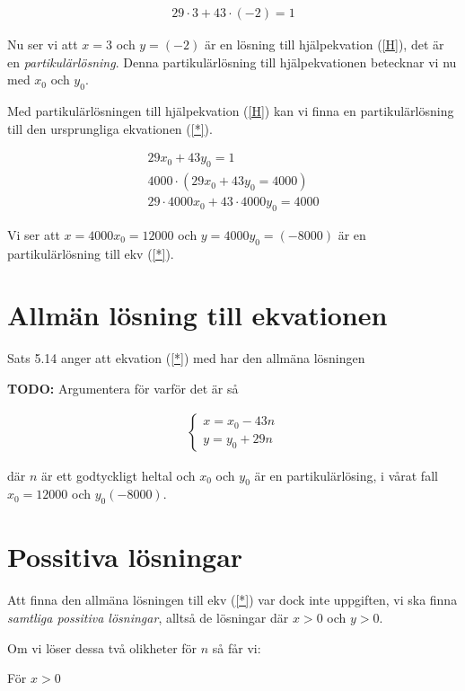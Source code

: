 \documentclass{article}
\begin{document}
\begin{gather*}
  29 \cdot 3 + 43 \cdot (-2) = 1
\end{gather*}

Nu ser vi att $x = 3$ och $y = (-2)$ är en lösning till hjälpekvation (\ref{H}), det är en \emph{partikulärlösning}.
Denna partikulärlösning till hjälpekvationen betecknar vi nu med $x_{0}$ och $y_{0}$.

Med partikulärlösningen till hjälpekvation (\ref{H}) kan vi finna en partikulärlösning till den ursprungliga ekvationen (\ref{*}).

\begin{gather*}
  29x_{0} + 43y_{0} = 1\\
  4000 \cdot (29x_{0} + 43y_{0} = 4000) \\
  29 \cdot 4000x_{0} + 43 \cdot 4000y_{0} = 4000
\end{gather*}

Vi ser att $x = 4000x_0 = 12000$ och $y = 4000y_0 = (-8000)$ är en partikulärlösning till ekv (\ref{*}).

\section*{Allmän lösning till ekvationen}

Sats 5.14 anger att ekvation (\ref{*}) med har den allmäna lösningen

\centerline{\textbf{TODO:} Argumentera för varför det är så}

\begin{gather*}
  \begin{cases}
    x = x_0 - 43n \\
    y = y_0 + 29n
  \end{cases}
\end{gather*}

där $n$ är ett godtyckligt heltal och $x_0$ och $y_0$ är en partikulärlösing, i vårat fall $x_0 = 12000$ och $y_0 (-8000)$.


\section*{Possitiva lösningar}

Att finna den allmäna lösningen till ekv (\ref{*}) var dock inte uppgiften, vi ska finna \emph{samtliga possitiva lösningar}, alltså de lösningar där $x > 0$ och $y > 0$.

Om vi löser dessa två olikheter för $n$ så får vi:

För $x > 0$
\end{document}
